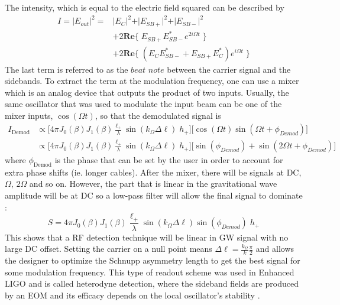 		The	intensity, which is equal to the electric field squared can be described by
		\begin{equation}\label{RFdet}
		\begin{aligned}
			I	= \vert E_{out} \vert^2  =	&\vert E_{C}\vert^2 + \vert E_{SB+}\vert^2 + \vert E_{SB-}\vert^2 \\
										  	& + 2 \mathbf{Re} \{ \; E_{SB+} E^*_{SB-} e^{2i\Omega t} \; \}\\
										  	& + 2 \mathbf{Re} \{ \; (E_{C} E^*_{SB-} +  E_{SB+} E^*_{C} ) e^{i\Omega t} \; \}
		\end{aligned}
		\end{equation}
		The last term is referred to as the $beat$ $note$ between the carrier signal and the sidebands.  To extract the term at the modulation frequency, one can use a mixer which is an analog device that outputs the product of two inputs. Usually, the same oscillator that was used to modulate the input beam can be one of the mixer inputs, $\cos(\Omega t)$,  so that the demodulated signal is
		\begin{equation}
		\begin{aligned}
		I_{\text{Demod}} 	&\propto \big[ 4 \pi  J_0(\beta) J_1(\beta) \frac{\ell_+}{\lambda}  \sin(k_{\Omega} \Delta \ell)  \; h_{+}\big] \big[ \cos(\Omega t)  \sin(\Omega t + \phi_{Demod}) \big] \\
					&\propto \big[ 4 \pi  J_0(\beta) J_1(\beta) \frac{\ell_+}{\lambda}  \sin(k_{\Omega} \Delta \ell)  \; h_{+}\big] \big[ \sin(\phi_{Demod}) + \sin(2\Omega t + \phi_{Demod}) \big]
		\end{aligned}
		\end{equation}
		where $\phi_{\text{Demod}}$ is the phase that can be set by the user in order to account for extra phase shifts (ie. longer cables). After the mixer, there will be signals at DC, $\Omega$, $2\Omega$ and so on. However, the part that is linear in the gravitational wave amplitude will be at DC so a low-pass filter will allow the final signal to dominate \cite{BlackPDH}:
		\begin{equation}\label{eq:SM_hetero}
		S = 4 \pi  J_0(\beta) J_1(\beta) \frac{\ell_+}{\lambda}  \sin(k_{\Omega} \Delta \ell) \sin(\phi_{Demod}) \; h_{+}
		\end{equation}
		This shows that a RF detection technique will be linear in GW signal with no large DC offset. Setting the carrier on a null point means $\Delta \ell = \frac{k_{\Omega}}{k} \frac{\pi}{2}$ and allows the designer to optimize the Schnupp asymmetry length to get the best signal for some modulation frequency. This type of readout scheme was used in Enhanced LIGO and is called heterodyne detection, where the sideband fields are produced by an EOM and its efficacy depends on the local oscillator's stability \cite{FritschelReadout}.  
